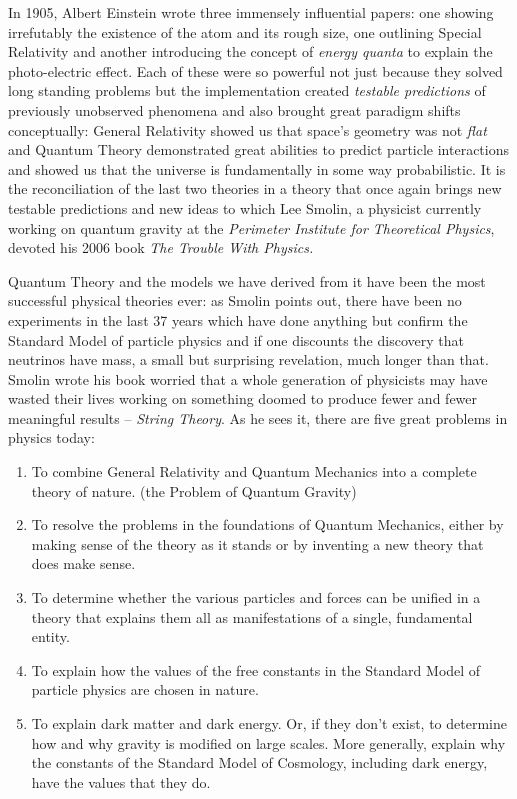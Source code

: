 \documentclass[1opt,a4paper]{article}
\newcounter{count}
\begin{document}
\begin{multicols}{2}

In 1905, Albert Einstein wrote three immensely influential papers: one
showing irrefutably the existence of the atom and its rough size, one
outlining Special Relativity and another introducing the concept of
\emph{energy quanta} to explain the photo-electric effect. Each of these
were so powerful not just because they solved long standing problems but
the implementation created \emph{testable predictions} of previously
unobserved phenomena and also brought great paradigm shifts
conceptually: General Relativity showed us that space's geometry was not
\emph{flat} and Quantum Theory demonstrated great abilities to predict
particle interactions and showed us that the universe is fundamentally
in some way probabilistic. It is the reconciliation of the last two
theories in a theory that once again brings new testable predictions and
new ideas to which Lee Smolin, a physicist currently working on quantum
gravity at the \emph{Perimeter Institute for Theoretical Physics},
devoted his 2006 book \emph{The Trouble With Physics.}

Quantum Theory and the models we have derived from it have been the most
successful physical theories ever: as Smolin points out, there have been
no experiments in the last 37 years which have done anything but confirm
the Standard Model of particle physics and if one discounts the
discovery that neutrinos have mass, a small but surprising revelation,
much longer than that. Smolin wrote his book worried that a whole
generation of physicists may have wasted their lives working on
something doomed to produce fewer and fewer meaningful results --
\emph{String Theory}. As he sees it, there are five great problems in
physics today:

\begin{enumerate}
	\item
	To combine General Relativity and Quantum Mechanics into a complete
	theory of nature. (the Problem of Quantum Gravity)
	\item
	To resolve the problems in the foundations of Quantum Mechanics,
	either by making sense of the theory as it stands or by inventing a
	new theory that does make sense.
	\item
	To determine whether the various particles and forces can be unified
	in a theory that explains them all as manifestations of a single,
	fundamental entity.
	\item
	To explain how the values of the free constants in the Standard Model
	of particle physics are chosen in nature.
	\item
	To explain dark matter and dark energy. Or, if they don't exist, to
	determine how and why gravity is modified on large scales. More
	generally, explain why the constants of the Standard Model of
	Cosmology, including dark energy, have the values that they do.
\end{enumerate}


\end{multicols}
\end{document}
